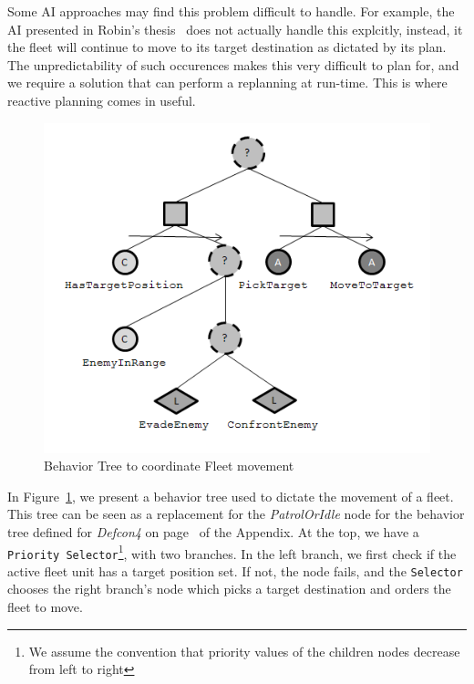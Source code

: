        Some AI approaches may find this problem difficult to handle. For example, the AI presented in Robin's thesis~\cite{robbot} does not actually handle this explcitly, instead, it the fleet will continue to move to its target destination as dictated by its plan. The unpredictability of such occurences makes this very difficult to plan for, and we require a solution that can perform a replanning at run-time.  This is where reactive planning comes in useful.
              
       \newpage
       
       \begin{figure}[h]                
                \begin{center}
                \includegraphics[scale=0.6]{images/movefleet.png}
                \caption{Behavior Tree to coordinate Fleet movement}
                \label{img:movefleet}
                \end{center}            
       \end{figure}
       
       In Figure~\ref{img:movefleet}, we present a behavior tree used to dictate the movement of a fleet. This tree can be seen as a replacement for the \emph{PatrolOrIdle} node for the behavior tree defined for \emph{Defcon4} on page~\pageref{app:d4} of the Appendix. At the top, we have a \texttt{Priority Selector}\footnote{We assume the convention that priority values of the children nodes decrease from left to right}, with two branches. In the left branch, we first check if the active fleet unit has a target position set. If not, the node fails, and the \texttt{Selector} chooses the right branch's node which picks a target destination and orders the fleet to move.
       
